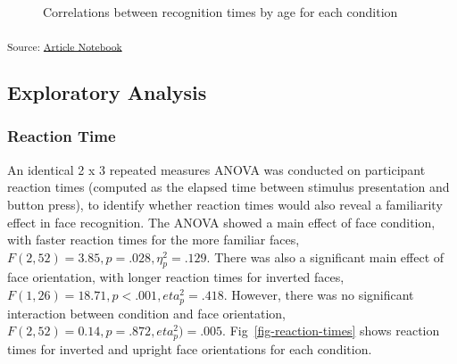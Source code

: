 \documentclass[
  10pt,
  letterpaper,
]{article}
\begin{document}
\label{cell-fig-correlations}
\begin{figure}[H]


\caption{\label{fig-correlations}Correlations between recognition times
by age for each condition}

\end{figure}%

\textsubscript{Source:
\href{https://deborahapthorp.github.io/SelfFaceManuscript/index.qmd.html}{Article
Notebook}}

\subsection{Exploratory Analysis}\label{exploratory-analysis}

\subsubsection{Reaction Time}\label{reaction-time}

An identical 2 x 3 repeated measures ANOVA was conducted on participant
reaction times (computed as the elapsed time between stimulus
presentation and button press), to identify whether reaction times would
also reveal a familiarity effect in face recognition. The ANOVA showed a
main effect of face condition, with faster reaction times for the more
familiar faces, \(F(2, 52) = 3.85, p = .028, \eta_p^2 = .129\). There
was also a significant main effect of face orientation, with longer
reaction times for inverted faces,
\(F(1, 26) = 18.71, p <.001, eta_p^2 = .418\). However, there was no
significant interaction between condition and face orientation,
\(F(2, 52) = 0.14, p = .872, eta_p^2) = .005\).
Fig~\ref{fig-reaction-times} shows reaction times for inverted and
upright face orientations for each condition.
\end{document}
